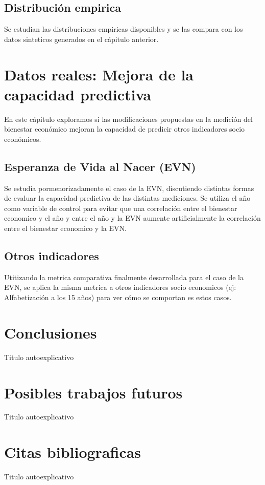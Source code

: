 \documentclass[11pt,a4paper]{tesis}
\begin{document}
\section{Distribución empirica}

Se estudian las distribuciones empiricas disponibles y se las compara con los datos sinteticos generados en el cápitulo anterior.

\chapter{Datos reales: Mejora de la capacidad predictiva}

En este cápitulo exploramos si las modificaciones propuestas en la medición del bienestar económico mejoran la capacidad de predicir otros indicadores socio económicos.

\section{Esperanza de Vida al Nacer (EVN)}

Se estudia pormenorizadamente el caso de la EVN, discutiendo distintas formas de evaluar la capacidad predictiva de las distintas mediciones. Se utiliza el año como variable de control para evitar que una correlación entre el bienestar economico y el año y entre el año y la EVN aumente artificialmente la correlación entre el bienestar economico y la EVN.


\section{Otros indicadores}

Utitizando la metrica comparativa finalmente desarrollada para el caso de la EVN, se aplica la misma metrica a otros indicadores socio economicos (ej: Alfabetización a los 15 años) para ver cómo se comportan es estos casos.



\chapter{Conclusiones}

Titulo autoexplicativo

\chapter{Posibles trabajos futuros}

Titulo autoexplicativo

\chapter{Citas bibliograficas}

Titulo autoexplicativo

\backmatter


\end{document}
